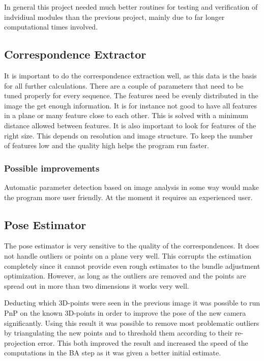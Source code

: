 In general this project needed much better routines for testing and verification of indvidiual modules than the previous project, mainly due to far longer computational times involved.

\subsection{Correspondence Extractor}
It is important to do the correspondence extraction well, as this data is the basis for all further calculations. There are a couple of parameters that need to be tuned properly for every sequence. The features need be evenly distributed in the image the get enough information. It is for instance not good to have all features in a plane or many feature close to each other. This is solved with a minimum distance allowed between features. It is also important to look for features of the right size. This depends on resolution and image structure. To keep the number of features low and the quality high helps the program run faster. 

\subsubsection{Possible improvements}
Automatic parameter detection based on image analysis in some way would make the program more user friendly. At the moment it requires an experienced user. 

\subsection{Pose Estimator}
The pose estimator is very sensitive to the quality of the correspondences. It does not handle outliers or points on a plane very well. This corrupts the estimation completely since it cannot provide even rough estimates to the bundle adjustment optimization. However, as long as the outliers are removed and the points are spread out in more than two dimensions it works very well. 

Deducting which 3D-points were seen in the previous image it was possible to run PnP on the known 3D-points in order to improve the pose of the new camera significantly. Using this result it was possible to remove most problematic outliers by triangulating the new points and to threshold them according to their re-projection error. This both improved the result and increased the speed of the computations in the BA step as it was given a better initial estimate.

